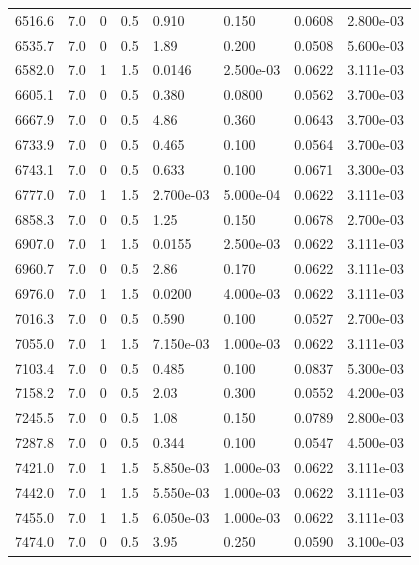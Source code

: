 \documentclass[preview]{standalone}
\begin{document}
{{{{{\begin{tabular}{L{1.2cm}C{1.2cm} C{0.3cm}C{0.5cm} C{1.4cm}C{1.4cm} C{1.4cm}C{1.4cm}}
  6516.6  &   7.0  & 0     & 0.5 &  0.910  & 0.150  & 0.0608 &  2.800e-03   \\ 
  6535.7  &   7.0  & 0     & 0.5 &  1.89  & 0.200  & 0.0508 &  5.600e-03   \\ 
  6582.0  &   7.0  & 1     & 1.5 &  0.0146  & 2.500e-03  & 0.0622 &  3.111e-03   \\ 
  6605.1  &   7.0  & 0     & 0.5 &  0.380  & 0.0800  & 0.0562 &  3.700e-03   \\ 
  6667.9  &   7.0  & 0     & 0.5 &  4.86  & 0.360  & 0.0643 &  3.700e-03   \\ 
  6733.9  &   7.0  & 0     & 0.5 &  0.465  & 0.100  & 0.0564 &  3.700e-03   \\ 
  6743.1  &   7.0  & 0     & 0.5 &  0.633  & 0.100  & 0.0671 &  3.300e-03   \\ 
  6777.0  &   7.0  & 1     & 1.5 &  2.700e-03  & 5.000e-04  & 0.0622 &  3.111e-03   \\ 
  6858.3  &   7.0  & 0     & 0.5 &  1.25  & 0.150  & 0.0678 &  2.700e-03   \\ 
  6907.0  &   7.0  & 1     & 1.5 &  0.0155  & 2.500e-03  & 0.0622 &  3.111e-03   \\ 
  6960.7  &   7.0  & 0     & 0.5 &  2.86  & 0.170  & 0.0622 &  3.111e-03   \\ 
  6976.0  &   7.0  & 1     & 1.5 &  0.0200  & 4.000e-03  & 0.0622 &  3.111e-03   \\ 
  7016.3  &   7.0  & 0     & 0.5 &  0.590  & 0.100  & 0.0527 &  2.700e-03   \\ 
  7055.0  &   7.0  & 1     & 1.5 &  7.150e-03  & 1.000e-03  & 0.0622 &  3.111e-03   \\ 
  7103.4  &   7.0  & 0     & 0.5 &  0.485  & 0.100  & 0.0837 &  5.300e-03   \\ 
  7158.2  &   7.0  & 0     & 0.5 &  2.03  & 0.300  & 0.0552 &  4.200e-03   \\ 
  7245.5  &   7.0  & 0     & 0.5 &  1.08  & 0.150  & 0.0789 &  2.800e-03   \\ 
  7287.8  &   7.0  & 0     & 0.5 &  0.344  & 0.100  & 0.0547 &  4.500e-03   \\ 
  7421.0  &   7.0  & 1     & 1.5 &  5.850e-03  & 1.000e-03  & 0.0622 &  3.111e-03   \\ 
  7442.0  &   7.0  & 1     & 1.5 &  5.550e-03  & 1.000e-03  & 0.0622 &  3.111e-03   \\ 
  7455.0  &   7.0  & 1     & 1.5 &  6.050e-03  & 1.000e-03  & 0.0622 &  3.111e-03   \\ 
  7474.0  &   7.0  & 0     & 0.5 &  3.95  & 0.250  & 0.0590 &  3.100e-03   \\ 

\end{tabular}}}}}}
\end{document}
